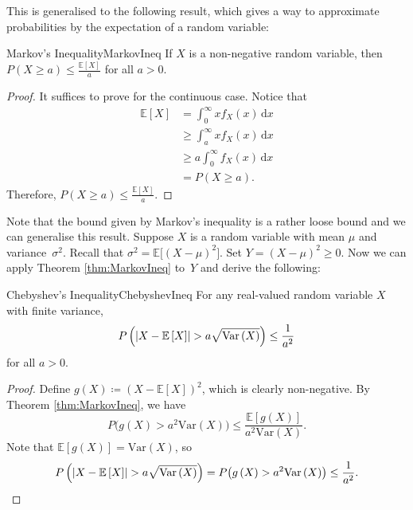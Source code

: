 \documentclass[math]{amznotes}
\theoremstyle{remark}
\newcommand{\0}{\mathbf{0}}
\newcommand{\1}{\mathbf{1}}
\renewcommand{\d}{\mathrm{d}}
\begin{document}
This is generalised to the following result, which gives a way to approximate probabilities by the expectation of a random variable:
\begin{thmbox}{Markov's Inequality}{MarkovIneq}
    If $X$ is a non-negative random variable, then $P\left(X \geq a\right) \leq \frac{\mathbb{E}\left[X\right]}{a}$ for all $a > 0$.
    \tcblower
    \begin{proof}
        It suffices to prove for the continuous case. Notice that 
        \begin{align*}
            \mathbb{E}\left[X\right] & = \int_{0}^{\infty}\!xf_X\left(x\right)\,\d x \\
            & \geq \int_{a}^{\infty}\!xf_X\left(x\right)\,\d x \\
            & \geq a\int_{0}^{\infty}\!f_X\left(x\right)\,\d x \\
            & = P\left(X \geq a\right).
        \end{align*}
        Therefore, $P\left(X \geq a\right) \leq \frac{\mathbb{E}\left[X\right]}{a}$.
    \end{proof}
\end{thmbox}
Note that the bound given by Markov's inequality is a rather loose bound and we can generalise this result. Suppose $X$ is a random variable with mean $\mu$ and variance~$\sigma^2$. Recall that $\sigma^2 = \mathbb{E}\bigl[(X - \mu)^2\bigr]$. Set $Y = (X - \mu)^2 \geq 0$. Now we can apply Theorem \ref{thm:MarkovIneq} to~$Y$ and derive the following:
\begin{thmbox}{Chebyshev's Inequality}{ChebyshevIneq}
    For any real-valued random variable $X$ with finite variance, 
    \begin{equation*}
        P\left({\left\lvert {X - \mathbb{E}\left[X\right]} \right\rvert} > a\sqrt{\mathrm{Var}\left(X\right)}\right) \leq \frac{1}{a^2}
    \end{equation*}
    for all $a > 0$.
    \tcblower
    \begin{proof}
        Define $g\left(X\right) \coloneqq \left(X - \mathbb{E}\left[X\right]\right)^2$, which is clearly non-negative. By Theorem \ref{thm:MarkovIneq}, we have 
        \begin{equation*}
            P\bigl(g\left(X\right) > a^2\mathrm{Var}\left(X\right)\bigr) \leq \frac{\mathbb{E}\left[g\left(X\right)\right]}{a^2\mathrm{Var}\left(X\right)}.
        \end{equation*}
        Note that $\mathbb{E}\left[g\left(X\right)\right] = \mathrm{Var}\left(X\right)$, so 
        \begin{equation*}
            P\left({\left\lvert {X - \mathbb{E}\left[X\right]} \right\rvert} > a\sqrt{\mathrm{Var}\left(X\right)}\right) = P\bigl(g\left(X\right) > a^2\mathrm{Var}\left(X\right)\bigr) \leq \frac{1}{a^2}.
        \end{equation*}
    \end{proof}
\end{thmbox}
\end{document}
